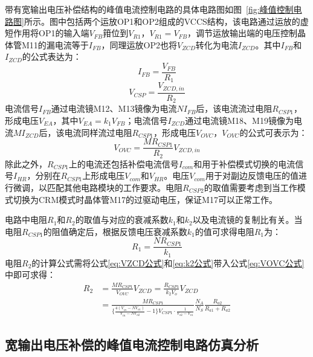 带有宽输出电压补偿结构的峰值电流控制电路的具体电路图如图~\ref{fig:峰值控制电路图}所示。图中包括两个运放OP1和OP2组成的VCCS结构，该电路通过运放的虚短作用将OP1的输入端$V_{FB}$箝位到$V_{R1}$，$V_{R1}=V_{FB}$，调节运放输出端的电压控制晶体管M11的漏电流等于$I_{FB}$，同理运放OP2也将$V_{ZCD}$转化为电流$I_{ZCD}$。其中$I_{FB}$和$I_{ZCD}$的公式表达为：
\begin{equation}
    \label{eq:IFB公式}
    I_{FB} = \frac{V_{FB}}{R_1}
\end{equation}
\begin{equation}
    \label{eq:IZCD公式}
    V_{CSP} = \frac{V_{ZCD,in}}{R_2}
\end{equation}
电流信号$I_{FB}$通过电流镜M12、M13镜像为电流$NI_{FB}$后，该电流流过电阻$R_{CSP1}$，形成电压$V_{EA}$，其中$V_{EA}=k_1V_{FB}$；电流信号$I_{ZCD}$通过电流镜M18、M19镜像为电流$MI_{ZCD}$后，该电流同样流过电阻$R_{CSP1}$，形成电压$V_{OVC}$，$V_{OVC}$的公式可表示为：
\begin{equation}
    \label{eq:VOVC公式}
    V_{OVC} = \frac{MR_{CSP1}}{R_2}  V_{ZCD,in}
\end{equation}
除此之外，$R_{CSP1}$上的电流还包括补偿电流信号$I_{com}$和用于补偿模式切换的电流信号$I_{HR}$，分别在$R_{CSP1}$上形成电压$V_{com}$和$V_{HR}$。电压$V_{com}$用于对副边反馈电压的值进行微调，以匹配其他电路模块的工作要求。电阻$R_{CSP2}$的取值需要考虑到当工作模式切换为CRM模式时晶体管M17的过驱动电压，保证M17可以正常工作。

电路中电阻$R_1$和$R_2$的取值与对应的衰减系数$k_1$和$k_2$以及电流镜的复制比有关。当电阻$R_{CSP1}$的阻值确定后，根据反馈电压衰减系数$k_1$的值可求得电阻$R_1$为：
\begin{equation}
    \label{eq:R1公式}
    R_1 = \frac{NR_{CSP1}}{k_1}
\end{equation}
电阻$R_2$的计算公式需将公式\eqref{eq:VZCD公式}和\eqref{eq:k2公式}带入公式\eqref{eq:VOVC公式}中即可求得：
\begin{align}
    \label{eq:R2公式}
    R_2 &= \frac{MR_{CSP1}}{V_{OVC}}  V_{ZCD} = \frac{R_{CSP1}}{k_2 V_o}  V_{ZCD}
    \\  &= \frac{MR_{CSP1}}{\{ \frac{4 (V_{in} - NV_{o1})}{V_{in} - NV_{o2}} - 1 \} V_{CSP1} \cdot \frac{1}{V_{o2} - V_{o1}}}  \frac{N_A}{N_S}\frac{R_{a2}}{R_{a1}+R_{a2}}
\end{align}


\subsection{宽输出电压补偿的峰值电流控制电路仿真分析}




